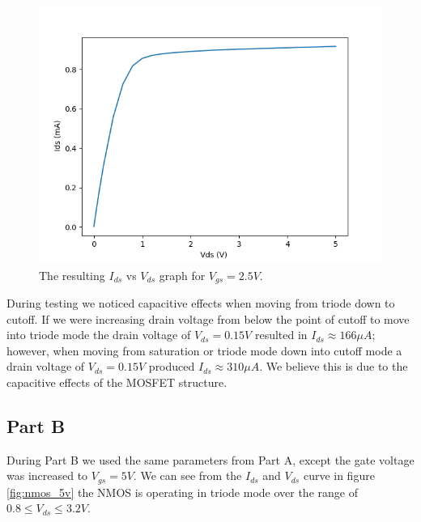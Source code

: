 		\begin{figure}[h!]
		\centering
		\includegraphics[scale=0.75]{../data/nmos.png}
		\caption{The resulting $I_{ds}$ vs $V_{ds}$ graph for $V_{gs}=2.5V$.}
		\label{fig:nmos}
		\end{figure}

		\FloatBarrier
		During testing we noticed capacitive effects when moving from triode down to cutoff. 
		If we were increasing drain voltage from below the point of cutoff to move into triode mode the drain voltage of $V_{ds}=0.15V$ resulted in $I_{ds}\approx 166 \mu A$;
		however, when moving from saturation or triode mode down into cutoff mode a drain voltage of $V_{ds}=0.15 V$ produced $I_{ds}\approx 310 \mu A$.
		We believe this is due to the capacitive effects of the MOSFET structure.

		\subsection{Part B}
		During Part B we used the same parameters from Part A, except the gate voltage was increased to $V_{gs} = 5V$. 
		We can see from the $I_{ds}$ and $V_{ds}$ curve in figure \ref{fig:nmos_5v} the NMOS is operating in triode mode over the range of $0.8 \le V_{ds} \le 3.2V$.

		\FloatBarrier

